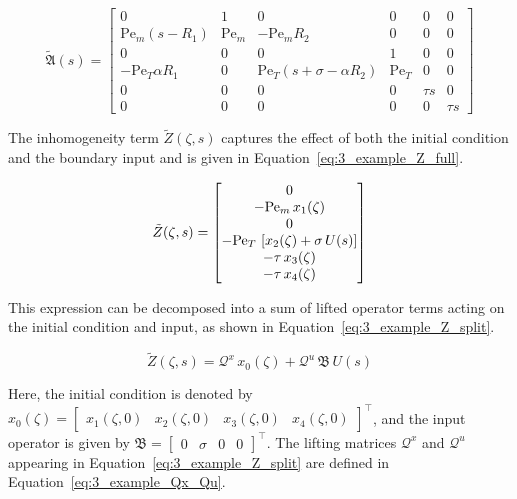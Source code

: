 \begin{equation} \label{eq:3_example_Atilde}
\tilde{\mathfrak{A}}(s) =
\begin{bmatrix}
0 & 1 & 0 & 0 & 0 & 0 \\
\mathrm{Pe}_m(s - R_1) & \mathrm{Pe}_m & -\mathrm{Pe}_m R_2 & 0 & 0 & 0 \\
0 & 0 & 0 & 1 & 0 & 0 \\
-\mathrm{Pe}_T \alpha R_1 & 0 & \mathrm{Pe}_T(s + \sigma - \alpha R_2) & \mathrm{Pe}_T & 0 & 0 \\
0 & 0 & 0 & 0 & \tau s & 0 \\
0 & 0 & 0 & 0 & 0 & \tau s
\end{bmatrix}
\end{equation}

The inhomogeneity term $\tilde{Z}(\zeta, s)$ captures the effect of both the initial condition and the boundary input and is given in Equation~\eqref{eq:3_example_Z_full}.

\begin{equation} \label{eq:3_example_Z_full}
\tilde{Z}(\zeta, s) =
\begin{bmatrix}
0 \\
-{\rm Pe}_m\, x_1(\zeta) \\
0 \\
-{\rm Pe}_T\, \left[ x_2(\zeta) + \sigma\, U(s) \right] \\
-\tau\, x_3(\zeta) \\
-\tau\, x_4(\zeta)
\end{bmatrix}
\end{equation}

This expression can be decomposed into a sum of lifted operator terms acting on the initial condition and input, as shown in Equation~\eqref{eq:3_example_Z_split}.

\begin{equation} \label{eq:3_example_Z_split}
\tilde{Z}(\zeta, s) = \mathcal{Q}^x\, x_0(\zeta) + \mathcal{Q}^u\, \mathfrak{B}\, U(s)
\end{equation}

Here, the initial condition is denoted by $x_0(\zeta) = \begin{bmatrix} x_1(\zeta, 0) & x_2(\zeta, 0) & x_3(\zeta, 0) & x_4(\zeta, 0) \end{bmatrix}^\top$, and the input operator is given by $\mathfrak{B} = \begin{bmatrix} 0 & \sigma & 0 & 0 \end{bmatrix}^\top$. The lifting matrices $\mathcal{Q}^x$ and $\mathcal{Q}^u$ appearing in Equation~\eqref{eq:3_example_Z_split} are defined in Equation~\eqref{eq:3_example_Qx_Qu}.

